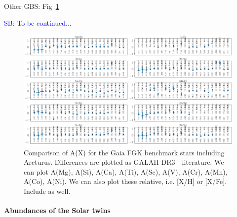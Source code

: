 \documentclass[fleqn,usenatbib,useAMS]{mnras}
\newcommand\SB[1]{\textcolor{blue}{SB: #1}}
\begin{document}
Other GBS: Fig~\ref{fig:gbs_performance_abundances}

\SB{To be continued...}
\begin{figure}
\centering
\includegraphics[width=\textwidth]{figures/gbs_performance_abundances.png}
\caption{Comparison of A(X) for the Gaia FGK benchmark stars \citep{Jofre2018a} including Arcturus. Differences are plotted as GALAH DR3 - literature. We can plot A(Mg), A(Si), A(Ca), A(Ti), A(Sc), A(V), A(Cr), A(Mn), A(Co), A(Ni). We can also plot these relative, i.e. [X/H] or [X/Fe]. Include \citet{Ramirez2011} as well.}
\label{fig:gbs_performance_abundances}
\end{figure}

\paragraph*{Abundances of the Solar twins}
\end{document}
